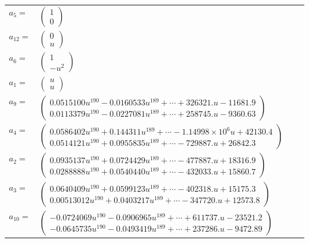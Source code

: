 \documentclass[1p]{elsarticle_modified}
\theoremstyle{definition}
\begin{document}
\begin{tabular}{m{7pt} m{180pt} m{7pt} m{180pt} }
\flushright $a_{5}=$&$\begin{pmatrix}1\\0\end{pmatrix}$ \\
\flushright $a_{12}=$&$\begin{pmatrix}0\\u\end{pmatrix}$ \\
\flushright $a_{6}=$&$\begin{pmatrix}1\\- u^2\end{pmatrix}$ \\
\flushright $a_{1}=$&$\begin{pmatrix}u\\u\end{pmatrix}$ \\
\flushright $a_{9}=$&$\begin{pmatrix}0.0515100 u^{190}-0.0160533 u^{189}+\cdots+326321. u-11681.9\\0.0113379 u^{190}-0.0227081 u^{189}+\cdots+258745. u-9360.63\end{pmatrix}$ \\
\flushright $a_{4}=$&$\begin{pmatrix}0.0586402 u^{190}+0.144311 u^{189}+\cdots-1.14998\times10^{6} u+42130.4\\0.0514121 u^{190}+0.0955835 u^{189}+\cdots-729887. u+26842.3\end{pmatrix}$ \\
\flushright $a_{2}=$&$\begin{pmatrix}0.0935137 u^{190}+0.0724429 u^{189}+\cdots-477887. u+18316.9\\0.0288888 u^{190}+0.0540440 u^{189}+\cdots-432033. u+15860.7\end{pmatrix}$ \\
\flushright $a_{3}=$&$\begin{pmatrix}0.0640409 u^{190}+0.0599123 u^{189}+\cdots-402318. u+15175.3\\0.00513012 u^{190}+0.0403217 u^{189}+\cdots-347720. u+12573.8\end{pmatrix}$ \\
\flushright $a_{10}=$&$\begin{pmatrix}-0.0724069 u^{190}-0.0906965 u^{189}+\cdots+611737. u-23521.2\\-0.0645735 u^{190}-0.0493419 u^{189}+\cdots+237286. u-9472.89\end{pmatrix}$ \\

\end{tabular}
\end{document}

